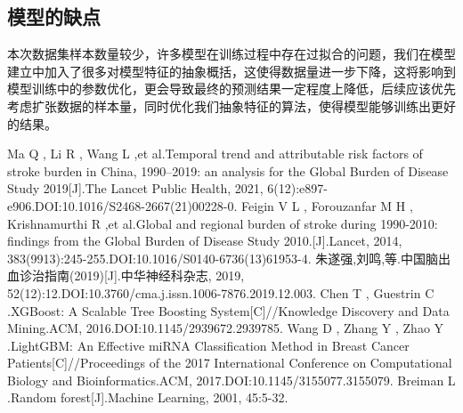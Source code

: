 \documentclass[bwprint]{gmcmthesis}
\begin{document}
		\subsection{模型的缺点}
			本次数据集样本数量较少，许多模型在训练过程中存在过拟合的问题，我们在模型建立中加入了很多对模型特征的抽象概括，这使得数据量进一步下降，这将影响到模型训练中的参数优化，更会导致最终的预测结果一定程度上降低，后续应该优先考虑扩张数据的样本量，同时优化我们抽象特征的算法，使得模型能够训练出更好的结果。
	
	
	\begin{thebibliography}{9}%
	  Ma Q , Li R , Wang L ,et al.Temporal trend and attributable risk factors of stroke burden in China, 1990–2019: an analysis for the Global Burden of Disease Study 2019[J].The Lancet Public Health, 2021, 6(12):e897-e906.DOI:10.1016/S2468-2667(21)00228-0.
	 Feigin V L , Forouzanfar M H , Krishnamurthi R ,et al.Global and regional burden of stroke during 1990-2010: findings from the Global Burden of Disease Study 2010.[J].Lancet, 2014, 383(9913):245-255.DOI:10.1016/S0140-6736(13)61953-4.
	 朱遂强,刘鸣,等.中国脑出血诊治指南(2019)[J].中华神经科杂志, 2019, 52(12):12.DOI:10.3760/cma.j.issn.1006-7876.2019.12.003.
	 Chen T , Guestrin C .XGBoost: A Scalable Tree Boosting System[C]//Knowledge Discovery and Data Mining.ACM, 2016.DOI:10.1145/2939672.2939785.
	 Wang D , Zhang Y , Zhao Y .LightGBM: An Effective miRNA Classification Method in Breast Cancer Patients[C]//Proceedings of the 2017 International Conference on Computational Biology and Bioinformatics.ACM, 2017.DOI:10.1145/3155077.3155079.
	 Breiman L .Random forest[J].Machine Learning, 2001, 45:5-32.
	\end{thebibliography}
	
	
	\clearpage
\end{document}
